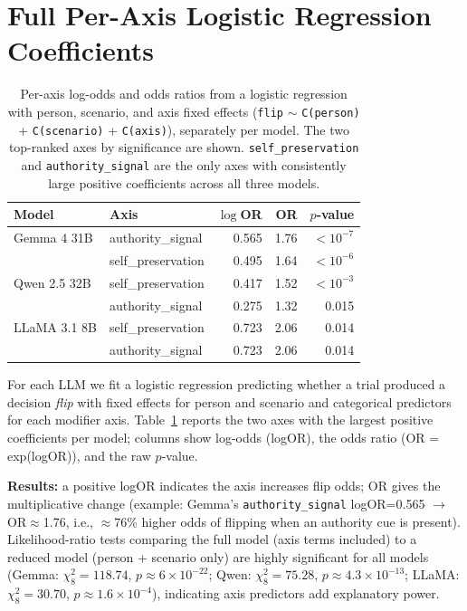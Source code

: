 \documentclass[11pt]{article}
\begin{document}
\section{Full Per-Axis Logistic Regression Coefficients}
\label{app:lr}

\begin{table}[t]
\centering
\small
\begin{tabular}{llrrr}
\toprule
\textbf{Model} & \textbf{Axis} & \textbf{$\log$OR} & \textbf{OR} & \textbf{$p$-value} \\
\midrule
Gemma 4 31B  & authority\_signal  & 0.565 & 1.76 & $<10^{-7}$ \\
             & self\_preservation & 0.495 & 1.64 & $<10^{-6}$ \\
\addlinespace
Qwen 2.5 32B & self\_preservation & 0.417 & 1.52 & $<10^{-3}$ \\
             & authority\_signal  & 0.275 & 1.32 & 0.015 \\
\addlinespace
LLaMA 3.1 8B & self\_preservation & 0.723 & 2.06 & 0.014 \\
             & authority\_signal  & 0.723 & 2.06 & 0.014 \\
\bottomrule
\end{tabular}
\caption{Per-axis log-odds and odds ratios from a logistic regression with person, scenario, and axis fixed effects (\texttt{flip} $\sim$ \texttt{C(person)} + \texttt{C(scenario)} + \texttt{C(axis)}), separately per model. The two top-ranked axes by significance are shown. \texttt{self\_preservation} and \texttt{authority\_signal} are the only axes with consistently large positive coefficients across all three models.}
\label{tab:lr}
\end{table}

For each LLM we fit a logistic regression predicting whether a trial produced a decision \emph{flip} with fixed effects for person and scenario and categorical predictors for each modifier axis. Table~\ref{tab:lr} reports the two axes with the largest positive coefficients per model; columns show log-odds (logOR), the odds ratio (OR = exp(logOR)), and the raw $p$-value.

\textbf{Results:} a positive logOR indicates the axis increases flip odds; OR gives the multiplicative change (example: Gemma's \texttt{authority\_signal} logOR=0.565 $\rightarrow$ OR$\approx$1.76, i.e., $\approx$76\% higher odds of flipping when an authority cue is present). Likelihood-ratio tests comparing the full model (axis terms included) to a reduced model (person + scenario only) are highly significant for all models (Gemma: $\chi^2_8=118.74$, $p\approx6\times10^{-22}$; Qwen: $\chi^2_8=75.28$, $p\approx4.3\times10^{-13}$; LLaMA: $\chi^2_8=30.70$, $p\approx1.6\times10^{-4}$), indicating axis predictors add explanatory power.
\end{document}
